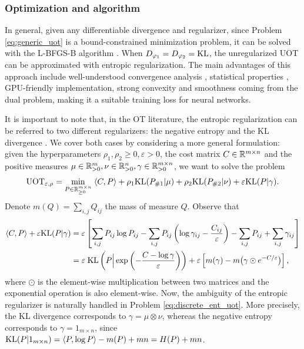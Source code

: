 \subsubsection{Optimization and algorithm} \label{sub:uot_optim}

In general, given any differentiable divergence and regularizer, since Problem \eqref{eq:generic_uot}
is a bound-constrained minimization problem, it can be solved with the L-BFGS-B algorithm
\citep{Byrd95,Zhu97}. When $D_{\varphi_1} = D_{\varphi_2} = \text{KL}$, the unregularized UOT can
be approximated with entropic regularization. The main advantages of this approach include
well-understood convergence analysis \citep{Chizat18a}, statistical properties \citep{Sejourne19},
GPU-friendly implementation, strong convexity and smoothness coming from the dual problem,
making it a suitable training loss for neural networks.

It is important to note that, in the OT literature, the entropic regularization
can be referred to two different regularizers: the negative entropy \citep{Frogner15, Chizat18a} and
the KL divergence \citep{Sejourne19}. We cover both cases by considering a
more general formulation: given the hyperparameters
$\rho_1, \rho_2 \geq 0, \varepsilon > 0$, the cost matrix $C \in \mathbb R^{m \times n}$
and the positive measures $\mu \in \mathbb R^m_{> 0}, \nu \in \mathbb R^n_{> 0}, \gamma \in \mathbb R^{m \times n}_{> 0}$,
we want to solve the problem
\begin{align}
  \label{eq:discrete_ent_uot}
  \text{UOT}_{\varepsilon, \rho} = \min_{P \in \mathbb R^{m \times n}_{\geq 0}}
  \; \langle C, P \rangle + \rho_1 \text{KL}(P_{\# 1} | \mu)
  + \rho_2 \text{KL}(P_{\# 2} | \nu) + \varepsilon \text{KL}(P | \gamma).
\end{align}
Denote $m(Q) = \sum_{i, j} Q_{ij}$ the mass of measure $Q$. Observe that
\begin{align}
  \langle C, P \rangle + \varepsilon \text{KL}(P | \gamma) &=
  \varepsilon \left[ \sum_{i, j} P_{ij} \log P_{ij} -
  \sum_{i, j} P_{ij} \left( \log \gamma_{ij} - \frac{C_{ij}}{\varepsilon} \right)
  - \sum_{i, j} P_{ij} + \sum_{i, j} \gamma_{ij} \right] \\
  &= \varepsilon \; \text{KL} \left(P \Big| \exp \left( -\frac{C - \log \gamma}{\varepsilon} \right) \right)
  + \varepsilon \left[ m(\gamma) - m \big(\gamma \odot e^{-C / \varepsilon} \big) \right],
\end{align}
where $\odot$ is the element-wise multiplication between two matrices and the exponential operation
is also element-wise. Now, the ambiguity of the entropic regularizer is naturally handled in
Problem \eqref{eq:discrete_ent_uot}. More precisely,
the KL divergence corresponds to $\gamma = \mu \otimes \nu$, whereas
the negative entropy corresponds to $\gamma = 1_{m \times n}$,
since $\text{KL}(P | 1_{m \times n}) = \langle P, \log P \rangle - m(P) + mn = H(P) + mn$.

